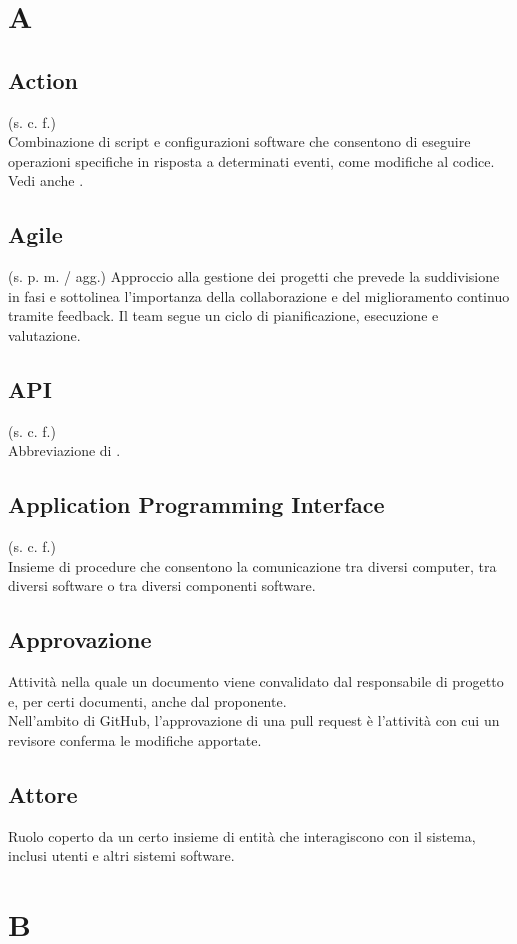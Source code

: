 \section{A}
\subsection{Action}
(s. c. f.)\\
Combinazione di script e configurazioni software che consentono di eseguire operazioni
specifiche in risposta a determinati eventi, come modifiche al codice.
Vedi anche .
\subsection{Agile}
(s. p. m. / agg.)
Approccio alla gestione dei progetti che prevede la suddivisione in fasi e sottolinea
l'importanza della collaborazione e del miglioramento continuo tramite feedback.
Il team segue un ciclo di pianificazione, esecuzione e valutazione.
\subsection{API}
(s. c. f.)\\
Abbreviazione di .
\subsection{Application Programming Interface}
\label{Application Programming Interface}
(s. c. f.)\\
Insieme di procedure che consentono la comunicazione tra diversi computer, tra diversi
software o tra diversi componenti software.
\subsection{Approvazione}
Attività nella quale un documento viene convalidato dal responsabile di
progetto e, per certi documenti, anche dal proponente. \\ Nell'ambito di
GitHub, l'approvazione di una pull request è l'attività con cui un revisore
conferma le modifiche apportate.
\subsection{Attore}
Ruolo coperto da un certo insieme di entità che interagiscono con il sistema,
inclusi utenti e altri sistemi software. \pagebreak
\section{B}
